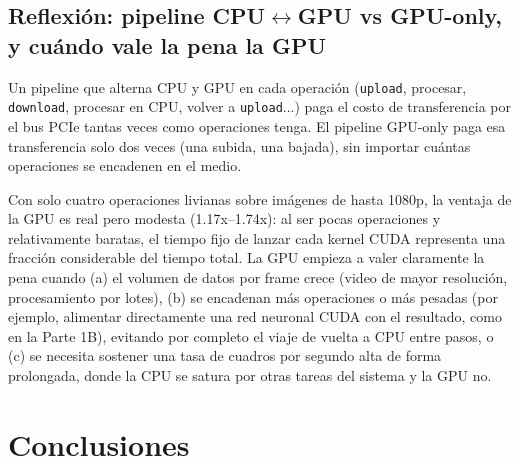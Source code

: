 \documentclass[12pt,a4paper]{article}
\let\oldsubsection\subsection
\renewcommand{\subsection}[1]{\needspace{5\baselineskip}\oldsubsection{#1}}
\begin{document}
\subsection{Reflexión: pipeline CPU$\leftrightarrow$GPU vs GPU-only, y cuándo vale la pena la GPU}

Un pipeline que alterna CPU y GPU en cada operación (\texttt{upload}, procesar, \texttt{download}, procesar en CPU, volver a \texttt{upload}...) paga el costo de transferencia por el bus PCIe tantas veces como operaciones tenga. El pipeline GPU-only paga esa transferencia solo dos veces (una subida, una bajada), sin importar cuántas operaciones se encadenen en el medio.

Con solo cuatro operaciones livianas sobre imágenes de hasta 1080p, la ventaja de la GPU es real pero modesta (1.17x--1.74x): al ser pocas operaciones y relativamente baratas, el tiempo fijo de lanzar cada kernel CUDA representa una fracción considerable del tiempo total. La GPU empieza a valer claramente la pena cuando (a) el volumen de datos por frame crece (video de mayor resolución, procesamiento por lotes), (b) se encadenan más operaciones o más pesadas (por ejemplo, alimentar directamente una red neuronal CUDA con el resultado, como en la Parte 1B), evitando por completo el viaje de vuelta a CPU entre pasos, o (c) se necesita sostener una tasa de cuadros por segundo alta de forma prolongada, donde la CPU se satura por otras tareas del sistema y la GPU no.

\section{Conclusiones}
\end{document}
